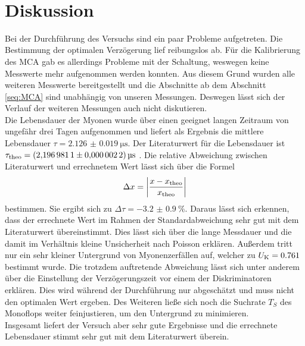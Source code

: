 \
\section{Diskussion}

\noindent
Bei der Durchführung des Versuchs sind ein paar Probleme aufgetreten. 
Die Bestimmung der optimalen Verzögerung lief reibungslos ab. 
Für die Kalibrierung des MCA gab es allerdings Probleme mit der Schaltung, weswegen keine Messwerte mehr aufgenommen werden konnten.
Aus diesem Grund wurden alle weiteren Messwerte bereitgestellt und die Abschnitte ab dem Abschnitt \ref{seq:MCA} sind unabhängig von unseren Messungen.
Deswegen lässt sich der Verlauf der weiteren Messungen auch nicht diskutieren.\\
Die Lebensdauer der Myonen wurde über einen geeignet langen Zeitraum von ungefähr drei Tagen aufgenommen und liefert als Ergebnis die mittlere Lebensdauer $\tau = \SI{2.126(0019)}{\micro\second}$.
Der Literaturwert für die Lebensdauer ist $\tau_\t{theo} = \SI{2.1969811(00000022)}{\micro\second}$ \cite{PDG}.
Die relative Abweichung zwischen Literaturwert und errechnetem Wert lässt sich über die Formel
\begin{equation*}
    \Delta x = \left| \frac{x - x_\t{theo}}{x_\t{theo}} \right|
\end{equation*}
bestimmen. Sie ergibt sich zu $\Delta \tau =\SI{-3.2(09)}{\percent} $. Daraus lässt sich erkennen, dass der errechnete Wert im Rahmen der Standardabweichung sehr gut mit dem Literaturwert übereinstimmt.
Dies lässt sich über die lange Messdauer und die damit im Verhältnis kleine Unsicherheit nach Poisson erklären. 
Außerdem tritt nur ein sehr kleiner Untergrund von Myonenzerfällen auf, welcher zu $U_\t{K} = 0.761$ bestimmt wurde.
Die trotzdem auftretende Abweichung lässt sich unter anderem über die Einstellung der Verzögerungszeit vor einem der Diskriminatoren erklären. 
Dies wird während der Durchführung nur abgeschätzt und muss nicht den optimalen Wert ergeben. 
Des Weiteren ließe sich noch die Suchrate $T_S$ des Monoflops weiter feinjustieren, um den Untergrund zu minimieren.\\ 
Insgesamt liefert der Versuch aber sehr gute Ergebnisse und die errechnete Lebensdauer stimmt sehr gut mit dem Literaturwert überein.

